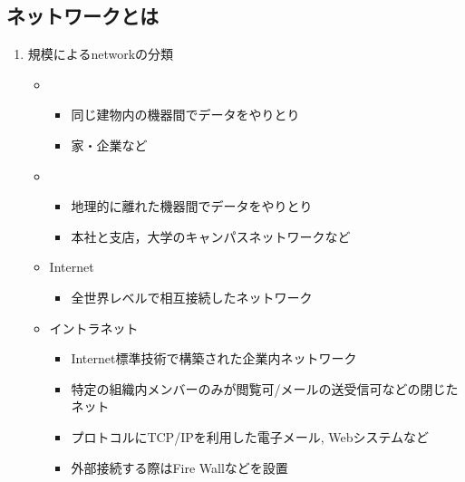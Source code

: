 \subsection{ネットワークとは}
\begin{enumerate}
    \item 規模によるnetworkの分類
    \begin{itemize}
        \item {}
        \begin{itemize}
            \item 同じ建物内の機器間でデータをやりとり
            \item 家・企業など
        \end{itemize}
        \item {}
        \begin{itemize}
            \item 地理的に離れた機器間でデータをやりとり
            \item 本社と支店，大学のキャンパスネットワークなど
        \end{itemize}
        \item Internet
        \begin{itemize}
            \item 全世界レベルで相互接続したネットワーク
        \end{itemize}
        \item イントラネット
        \begin{itemize}
            \item Internet標準技術で構築された企業内ネットワーク
            \item 特定の組織内メンバーのみが閲覧可/メールの送受信可などの閉じたネット
            \item プロトコルにTCP/IPを利用した電子メール, Webシステムなど
            \item 外部接続する際はFire Wallなどを設置
        \end{itemize}
    \end{itemize}
\end{enumerate}


